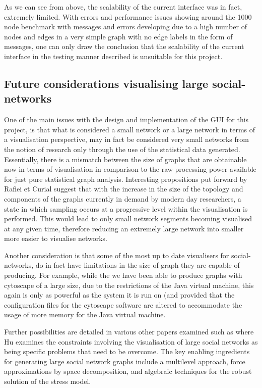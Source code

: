 As we can see from above, the scalability of the current interface was in fact,
extremely limited. With errors and performance issues showing around the 1000
node benchmark with messages and errors developing due to a high number of nodes
and edges in a very simple graph with no edge labels in the form of messages,
one can only draw the conclusion that the scalability of the current interface
in the testing manner described is unsuitable for this project.

\subsection{Future considerations visualising large social-networks}

One of the main issues with the design and implementation of the GUI for this project, is that what is considered a small network or a large network in terms of a visualisation perspective, may in fact be considered very small networks from the notion of research only through the use of the statistical data generated. Essentially, there is a mismatch between the size of graphs that are obtainable now in terms of visualisation in comparison to the raw processing power available for just pure statistical graph analysis. Interesting propositions put forward by Rafiei et Curial \cite{rafiei} suggest that with the increase in the size of the topology and components of the graphs currently in demand by modern day researchers, a state in which sampling occurs at a progressive level within the visualisation is performed. This would lead to only small network segments becoming visualised at any given time, therefore reducing an extremely large network into smaller more easier to visualise networks.

Another consideration is that some of the most up to date visualisers for social-networks, do in fact have limitations in the size of graph they are capable of producing. For example, while the we have been able to produce graphs with cytoscape of a large size, due to the restrictions of the Java virtual machine, this again is only as powerful as the system it is run on (and provided that the configuration files for the cytoscape software are altered to accommodate the usage of more memory for the Java virtual machine.

Further possibilities are detailed in various other papers examined such as \cite{Hu10algorithmsfor} where Hu examines the constraints involving the visualisation of large social networks as being specific problems that need to be overcome. The key enabling ingredients for generating large social network graphs include a multilevel approach, force approximations by space decomposition, and algebraic techniques for the robust solution of the stress model.

